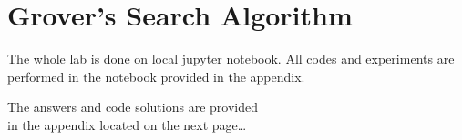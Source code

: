 \documentclass[a4paper, 10pt]{article}
\begin{document}
\subject
{}

\section{Grover's Search Algorithm}

The whole lab is done on local jupyter notebook.
All codes and experiments are performed in the notebook provided in the appendix.

\myspace

\begin{flushright}
	The answers and code solutions are provided \\
	in the appendix located on the next page\dots
\end{flushright}



\end{document}

